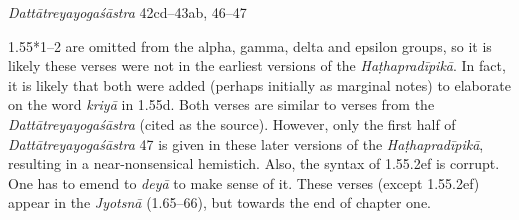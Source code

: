 \begin{ekdosis}
\begin{sources}[hp01_055_1]
\emph{Dattātreyayogaśāstra} 42cd–43ab, 46–47

\begin{versinnote}
\end{versinnote}

\end{sources}


\begin{philcomm}[hp01_055_1]
1.55*1–2 are omitted from the alpha, gamma, delta and epsilon groups, so it is likely these verses were not in the earliest versions of the \emph{Haṭhapradīpikā}. In fact, it is likely that both were added (perhaps initially as marginal notes) to elaborate on the word \emph{kriyā} in 1.55d. Both verses are similar to verses from the \emph{Dattātreyayogaśāstra} (cited as the source). However, only the first half of \emph{Dattātreyayogaśāstra} 47 is given in these later versions of the \emph{Haṭhapradīpikā}, resulting in a near-nonsensical hemistich. Also, the syntax of 1.55.2ef is corrupt. One has to emend to \emph{deyā} to make sense of it. These verses (except 1.55.2ef) appear in the \emph{Jyotsnā} (1.65–66), but towards the end of chapter one. 
\end{philcomm}




\end{ekdosis}
